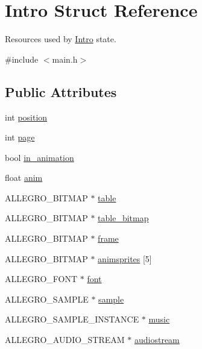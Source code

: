 \hypertarget{structIntro}{\section{\-Intro \-Struct \-Reference}
\label{structIntro}
}


\-Resources used by \hyperlink{structIntro}{\-Intro} state.  




{\ttfamily \#include $<$main.\-h$>$}

\subsection*{\-Public \-Attributes}
\begin{DoxyCompactItemize}
\item 
int \hyperlink{structIntro_a5c266b2590d4304f92fd3bad033f4375}{position}
\item 
int \hyperlink{structIntro_aaea1b2d24c0c9a5437c59d727c79ebd1}{page}
\item 
bool \hyperlink{structIntro_a2876fd8a7bfd940c3936eb6445984a22}{in\-\_\-animation}
\item 
float \hyperlink{structIntro_a7bac02ef374847f0efbe638892cb401f}{anim}
\item 
\-A\-L\-L\-E\-G\-R\-O\-\_\-\-B\-I\-T\-M\-A\-P $\ast$ \hyperlink{structIntro_a342227f3940dba9ed6b5d3bb4579fd48}{table}
\item 
\-A\-L\-L\-E\-G\-R\-O\-\_\-\-B\-I\-T\-M\-A\-P $\ast$ \hyperlink{structIntro_a77ea358d1f44d69e5477f5dedfc9fd2b}{table\-\_\-bitmap}
\item 
\-A\-L\-L\-E\-G\-R\-O\-\_\-\-B\-I\-T\-M\-A\-P $\ast$ \hyperlink{structIntro_a122ded263b7d3b22ee9a11555d84df52}{frame}
\item 
\-A\-L\-L\-E\-G\-R\-O\-\_\-\-B\-I\-T\-M\-A\-P $\ast$ \hyperlink{structIntro_ae89a2ad7dfed9e06a558a5f92bba55bc}{animsprites} \mbox{[}5\mbox{]}
\item 
\-A\-L\-L\-E\-G\-R\-O\-\_\-\-F\-O\-N\-T $\ast$ \hyperlink{structIntro_a896d4fdd74cf47535173eeaa6e81f734}{font}
\item 
\-A\-L\-L\-E\-G\-R\-O\-\_\-\-S\-A\-M\-P\-L\-E $\ast$ \hyperlink{structIntro_a0189475d44f8e19e6fe543371a9daedb}{sample}
\item 
\-A\-L\-L\-E\-G\-R\-O\-\_\-\-S\-A\-M\-P\-L\-E\-\_\-\-I\-N\-S\-T\-A\-N\-C\-E $\ast$ \hyperlink{structIntro_a461ce3f44fd4f7d2d3713e2f31c1d1ec}{music}
\item 
\-A\-L\-L\-E\-G\-R\-O\-\_\-\-A\-U\-D\-I\-O\-\_\-\-S\-T\-R\-E\-A\-M $\ast$ \hyperlink{structIntro_a879aa48597b2f7b6fbeb9f9911234350}{audiostream}
\end{DoxyCompactItemize}


